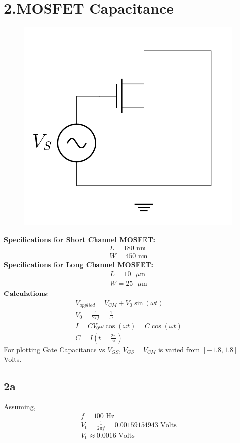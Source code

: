 \documentclass{article}
\begin{document}
\section{2.MOSFET Capacitance}
\begin{figure}[!ht]
    \centering
    \includegraphics[scale=0.5]{Images/2.png}
\end{figure}
\textbf{Specifications for Short Channel MOSFET:}
\begin{align}
    L = 180 \text{ nm} \\
    W = 450 \text{ nm}
\end{align}
\vspace{0.2in}
\textbf{Specifications for Long Channel MOSFET:}
\begin{align}
    L = 10 \text{ $\mu$m} \\
    W = 25 \text{ $\mu$m}
\end{align}
\vspace{0.2in}
\textbf{Calculations:}
\begin{align}
    V_{applied} = V_{CM} + V_{0}\sin(\omega t)  \\
    V_{0} = \frac{1}{2\pi f} = \frac{1}{\omega} \\
    I = CV_{0}\omega\cos(\omega t) = C\cos(\omega t) \\
    C = I(t=\frac{2\pi}{\omega})
\end{align}
For plotting Gate Capacitance vs $V_{GS}$, $V_{GS} = V_{CM}$ is varied from $[-1.8,1.8]$ Volts.
\vspace{0.2in}
\subsection{2a}
Assuming,
\begin{align}
    f = 100 \text{ Hz} \\
    V_{0} = \frac{1}{2\pi f} = 0.00159154943 \text{ Volts}\\
    V_{0} \approx 0.0016 \text{ Volts}
\end{align}
\pagebreak
\end{document}

